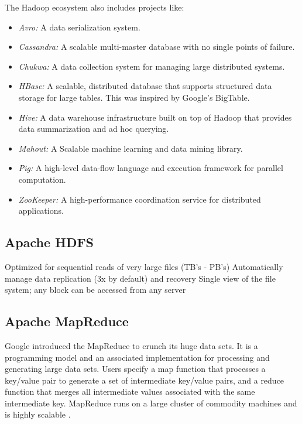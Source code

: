 \documentclass[12pt,a4paper]{report}
\begin{document}
The Hadoop ecosystem also includes projects like:\cite{website:apache-hadoop}

\begin{itemize}
\item \emph{Avro:} A data serialization system.
\item \emph{Cassandra:} A scalable multi-master database with no single points of failure.
\item \emph{Chukwa:} A data collection system for managing large distributed systems.
\item \emph{HBase:} A scalable, distributed database that supports structured data storage for large tables.
 This was inspired by Google's BigTable.
\item \emph{Hive:} A data warehouse infrastructure built on top of Hadoop that provides data summarization and ad hoc querying.
\item \emph{Mahout:} A Scalable machine learning and data mining library.
\item \emph{Pig:} A high-level data-flow language and execution framework for parallel computation.
\item \emph{ZooKeeper:} A high-performance coordination service for distributed applications.
\end{itemize}

\subsection{Apache HDFS}

Optimized for sequential reads of very large files (TB's - PB's)
Automatically manage data replication (3x by default) and recovery
Single view of the file system; any block can be accessed from any server

\subsection{Apache MapReduce}


Google introduced the MapReduce to crunch its huge data sets. 
It is a programming model and an associated implementation for processing 
and generating large data sets. Users specify a map function that processes a 
key/value pair to generate a set of intermediate key/value pairs, and a reduce 
function that merges all intermediate values associated with the same 
intermediate key. MapReduce runs on a large cluster of commodity machines 
and is highly scalable \cite{dean2008mapreduce}. 
\end{document}
